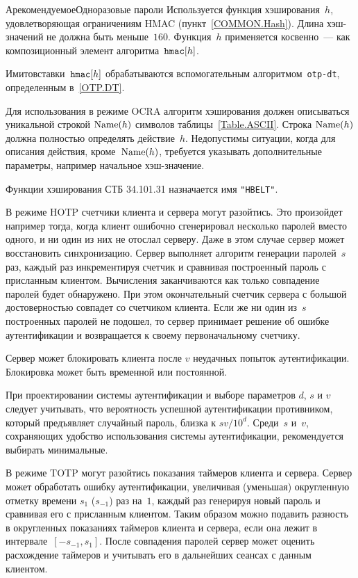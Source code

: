 \begin{appendix}{А}{рекомендуемое}{Одноразовые пароли}
Используется функция хэширования~$h$,
удовлетворяющая ограничениям HMAC (пункт~\ref{COMMON.Hash}).
Длина хэш-значений не должна быть меньше~$160$.
%
Функция~$h$ применяется косвенно~--- как композиционный элемент
алгоритма~$\texttt{hmac}[h]$.

Имитовставки~$\texttt{hmac}[h]$ обрабатываются вспомогательным 
алгоритмом~\texttt{otp-dt}, определенным в~\ref{OTP.DT}.

Для использования в режиме OCRA
алгоритм хэширования должен описываться уникальной строкой
$\text{Name}(h)$ символов таблицы~\ref{Table.ASCII}. 
%
Строка $\text{Name}(h)$ должна полностью определять действие~$h$.
Недопустимы ситуации, когда для описания действия, 
кроме~$\text{Name}(h)$, требуется указывать дополнительные параметры, 
например начальное хэш-значение.

Функции хэширования СТБ 34.101.31 назначается имя 
\texttt{"HBELT"}.



В режиме HOTP счетчики клиента и сервера могут разойтись.
Это произойдет например тогда, когда клиент ошибочно сгенерировал 
несколько паролей вместо одного, и ни один из них не отослал серверу. 
Даже в этом случае сервер может восстановить синхронизацию. 
Сервер выполняет алгоритм генерации паролей~$s$ раз, 
каждый раз инкрементируя счетчик и сравнивая построенный пароль 
с присланным клиентом. Вычисления заканчиваются как только 
совпадение паролей будет обнаружено. При этом окончательный счетчик 
сервера с большой достоверностью совпадет со счетчиком клиента.
%
Если же ни один из~$s$ построенных паролей не подошел, 
то сервер принимает решение об ошибке аутентификации
и возвращается к своему первоначальному счетчику.

Сервер может блокировать клиента после $v$ неудачных попыток аутентификации. 
Блокировка может быть временной или постоянной.

При проектировании системы аутентификации 
и выборе параметров $d$, $s$ и $v$ следует учитывать, 
что вероятность успешной аутентификации противником,
который предъявляет случайный пароль, близка к
${sv}/{10^d}$.
%
Среди~$s$ и~$v$, сохраняющих удобство использования системы аутентификации, 
рекомендуется выбирать минимальные.

В режиме TOTP могут разойтись показания таймеров клиента и сервера.
Сервер может обработать ошибку аутентификации, увеличивая (уменьшая) 
округленную отметку времени $s_{1}$ ($s_{-1}$) раз на~$1$,
каждый раз генерируя новый пароль и сравнивая его с присланным 
клиентом. Таким образом можно подавить разность в округленных показаниях
таймеров клиента и сервера, если она лежит в интервале~$[-s_{-1},s_1]$.
%
После совпадения паролей сервер может оценить расхождение
таймеров и учитывать его в дальнейших сеансах с данным клиентом.


\end{appendix}

